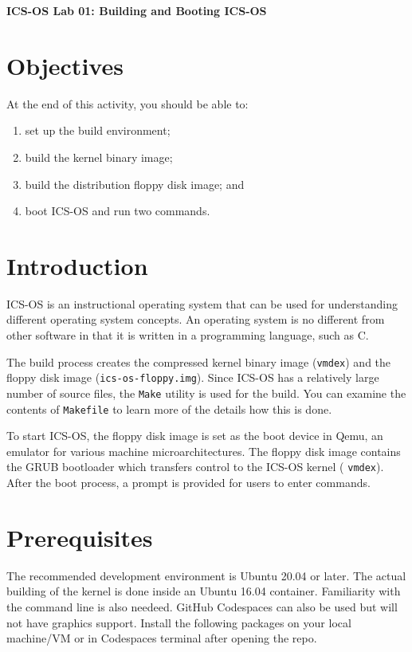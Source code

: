 \documentclass[a4paper, 11pt,oneside]{article}
\begin{document}
\begin{center}
	{\LARGE \textbf{ICS-OS Lab 01: Building and Booting ICS-OS}}
\end{center}

\section*{Objectives}
   At the end of this activity, you should be able to:
   \begin{enumerate}[itemsep=0pt,parsep=0pt]
   	   \item set up the build environment;
       \item build the kernel binary image;
       \item build the distribution floppy disk image; and
       \item boot ICS-OS and run two commands.
   \end{enumerate}   

\section{Introduction}
ICS-OS is an instructional operating system that can be used for understanding different operating system concepts.  An operating system is no different from other software in that it is written in a programming language, such as C. 

The build process creates the compressed kernel binary image (\texttt{vmdex}) and the floppy disk image (\texttt{ics-os-floppy.img}). Since ICS-OS has a relatively large number of source files, 
the \texttt{Make} utility is used for the build. You can examine the contents of \texttt{Makefile} 
to learn more of the details how this is done.

To start ICS-OS, the floppy disk image is set as the boot device in Qemu,  
an emulator for various machine microarchitectures. The floppy disk image 
contains the GRUB bootloader which transfers control to the ICS-OS kernel ( 
\texttt{vmdex}). After the boot process, a prompt is provided for users to 
enter commands. 

\section{Prerequisites}
The recommended development environment is Ubuntu 20.04 or later. The actual building of the kernel is done inside an Ubuntu 16.04 container. Familiarity with the command line is also needeed. GitHub Codespaces can also be used but will not have graphics support. Install the following packages on your local machine/VM or in Codespaces terminal after opening the repo. 
\end{document}
